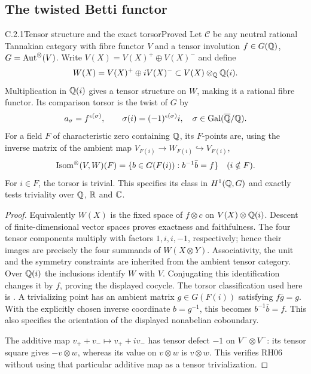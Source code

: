 \subsection{The twisted Betti functor}

\begin{result}{C.2.1}{Tensor structure and the exact torsor}{Proved}
Let $\mathcal C$ be any neutral rational Tannakian category with fibre functor $V$ and a tensor involution $f\in G(\mathbb Q)$, $G=\operatorname{Aut}^\otimes(V)$. Write $V(X)=V(X)^+\oplus V(X)^-$ and define
\[
 W(X)=V(X)^+\oplus iV(X)^-\subset V(X)\otimes_\mathbb Q\mathbb Q(i).
\]
Multiplication in $\mathbb Q(i)$ gives a tensor structure on $W$, making it a rational fibre functor. Its comparison torsor is the twist of $G$ by
\[
 a_\sigma=f^{\epsilon(\sigma)},\qquad
 \sigma(i)=(-1)^{\epsilon(\sigma)}i,
 \quad \sigma\in\operatorname{Gal}(\overline{\mathbb Q}/\mathbb Q).
\]
For a field $F$ of characteristic zero containing $\mathbb Q$, its $F$-points are, using the inverse matrix of the ambient map $V_{F(i)}\to W_{F(i)}\hookrightarrow V_{F(i)}$,
\[
 \operatorname{Isom}^\otimes(V,W)(F)=
 \{b\in G(F(i)):b^{-1}\bar b=f\}\quad(i\notin F).
\]
For $i\in F$, the torsor is trivial. This specifies its class in $H^1(\mathbb Q,G)$ and exactly tests triviality over $\mathbb Q$, $\mathbb R$ and $\mathbb C$.
\end{result}
\begin{proof}
Equivalently $W(X)$ is the fixed space of $f\otimes c$ on $V(X)\otimes\mathbb Q(i)$. Descent of finite-dimensional vector spaces proves exactness and faithfulness. The four tensor components multiply with factors $1,i,i,-1$, respectively; hence their images are precisely the four summands of $W(X\otimes Y)$. Associativity, the unit and the symmetry constraints are inherited from the ambient tensor category. Over $\mathbb Q(i)$ the inclusions identify $W$ with $V$. Conjugating this identification changes it by $f$, proving the displayed cocycle. The torsor classification used here is \cite[Theorem 3.2]{DM1982}. A trivializing point has an ambient matrix $g\in G(F(i))$ satisfying $f\bar g=g$. With the explicitly chosen inverse coordinate $b=g^{-1}$, this becomes $b^{-1}\bar b=f$. This also specifies the orientation of the displayed nonabelian coboundary.

The additive map $v_++v_-\mapsto v_++iv_-$ has tensor defect $-1$ on $V^-\otimes V^-$: its tensor square gives $-v\otimes w$, whereas its value on $v\otimes w$ is $v\otimes w$. This verifies RH06 without using that particular additive map as a tensor trivialization.
\end{proof}

